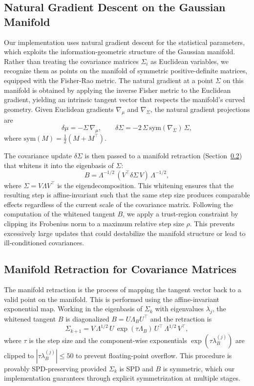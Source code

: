 \documentclass[twoside,11pt]{article}
\begin{document}
\subsection{Natural Gradient Descent on the Gaussian Manifold}
Our implementation uses natural gradient descent for the statistical parameters, which exploits the information-geometric structure of the Gaussian manifold. Rather than treating the covariance matrices $\Sigma_i$ as Euclidean variables, we recognize them as points on the manifold of symmetric positive-definite matrices, equipped with the Fisher-Rao metric. The natural gradient at a point $\Sigma$ on this manifold is obtained by applying the inverse Fisher metric to the Euclidean gradient, yielding an intrinsic tangent vector that respects the manifold's curved geometry. Given Euclidean gradients $\nabla_\mu$ and $\nabla_\Sigma$, the natural gradient projections are
\begin{equation}
\delta\mu = -\Sigma\,\nabla_\mu, \qquad
\delta\Sigma = -2\,\Sigma\,\mathrm{sym}(\nabla_\Sigma)\,\Sigma,
\end{equation}
where $\mathrm{sym}(M) = \tfrac{1}{2}(M + M^\top)$.

The covariance update $\delta\Sigma$ is then passed to a manifold retraction (Section~\ref{sec:retraction}) that whitens it into the eigenbasis of $\Sigma$:
\begin{equation}
B = \Lambda^{-1/2}\, (V^\top \delta\Sigma\, V)\, \Lambda^{-1/2},
\end{equation}
where $\Sigma = V \Lambda V^\top$ is the eigendecomposition.  This whitening ensures that the resulting step is affine-invariant such that the same step size produces comparable effects regardless of the current scale of the covariance matrix.  Following the computation of the whitened tangent $B$, we apply a trust-region constraint by clipping its Frobenius norm to a maximum relative step size $\rho$. This prevents excessively large updates that could destabilize the manifold structure or lead to ill-conditioned covariances.

\subsection{Manifold Retraction for Covariance Matrices}\label{sec:retraction}
The manifold retraction is the process of mapping the tangent vector back to a valid point on the manifold. This is performed using the affine-invariant exponential map. Working in the eigenbasis of $\Sigma_k$ with eigenvalues $\lambda_j$, the whitened tangent $B$ is diagonalized $B = U\Lambda_B U^\top$ and the retraction is
\begin{equation}
\Sigma_{k+1} = V\,\Lambda^{1/2}\, U\, \exp(\tau \Lambda_B)\, U^\top\, \Lambda^{1/2}\, V^\top,
\end{equation}
where $\tau$ is the step size and the component-wise exponentials $\exp(\tau \lambda_B^{(j)})$ are clipped to $|\tau \lambda_B^{(j)}| \le 50$ to prevent floating-point overflow.  This procedure is provably SPD-preserving provided $\Sigma_k$ is SPD and $B$ is symmetric, which our implementation guarantees through explicit symmetrization at multiple stages.
\end{document}
